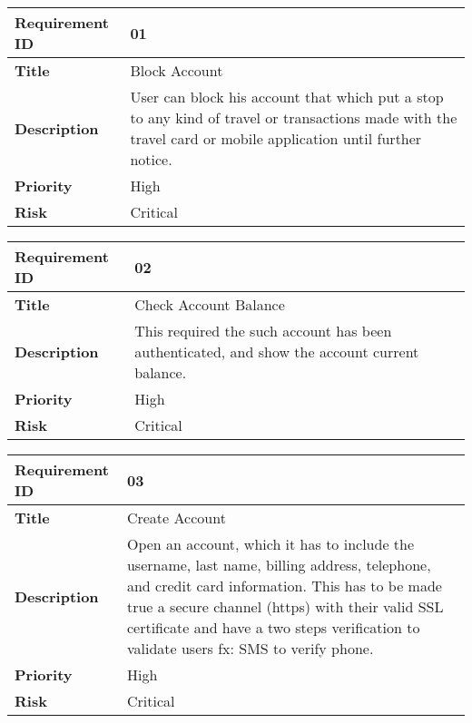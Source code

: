 \begin{center}
	\def\arraystretch{1.5}%
    \begin{tabular}{ | p{5cm} | p{5cm} |}
    \hline
    	\textbf{Requirement ID} & 01 \\ \hline
		\textbf{Title} & Block Account\\ \hline
		\textbf{Description} & User can block his account that which put a stop to any kind of travel or transactions made with the travel card or mobile application until further notice.\\ \hline
		\textbf{Priority} & High\\ \hline
		\textbf{Risk} & Critical\\
      \hline
    \end{tabular}
\end{center}

\begin{center}
	\def\arraystretch{1.5}%
    \begin{tabular}{ | p{5cm} | p{5cm} |}
    \hline
    	\textbf{Requirement ID} & 02 \\ \hline
		\textbf{Title} & Check Account Balance\\ \hline
		\textbf{Description} & This required the such account has been authenticated, and show the account current balance.\\ \hline
		\textbf{Priority} & High\\ \hline
		\textbf{Risk} & Critical\\
      \hline
    \end{tabular}
\end{center}

\begin{center}
	\def\arraystretch{1.5}%
    \begin{tabular}{ | p{5cm} | p{5cm} |}
    \hline
    	\textbf{Requirement ID} & 03 \\ \hline
		\textbf{Title} & Create Account\\ \hline
		\textbf{Description} & Open an account, which it has to include the username, last name, billing address, telephone, and credit card information. This has to be made true a secure channel (https) with their valid SSL certificate and have a two steps verification to validate users fx: SMS to verify phone.\\ \hline
		\textbf{Priority} & High\\ \hline
		\textbf{Risk} & Critical\\
      \hline
    \end{tabular}
\end{center}

